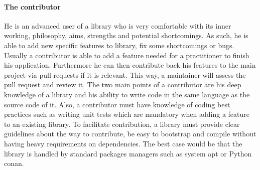 \paragraph{The contributor} He is an advanced user of a library who is very comfortable with its inner working,
philosophy, aims, strengths and potential shortcomings. As such, he is able to add new specific features to library, fix
some shortcomings or bugs. Usually a contributor is able to add a feature needed for a practitioner to finish his
application. Furthermore he can then contribute back his features to the main project via pull requests if it is
relevant. This way, a maintainer will assess the pull request and review it. The two main points of a contributor are
his deep knowledge of a library and his ability to write code in the same language as the source code of it. Also, a
contributor must have knowledge of coding best practices such as writing unit tests which are mandatory when adding a
feature to an existing library. To facilitate contribution, a library must provide clear guidelines about the way to
contribute, be easy to bootstrap and compile without having heavy requirements on dependencies. The best case would be
that the library is handled by standard packages managers such as system apt or Python conan.

